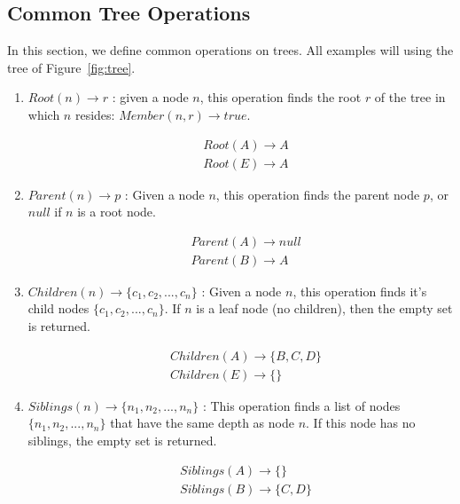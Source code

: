 \subsection{Common Tree Operations}

In this section, we define common operations on trees. All examples will using the tree of Figure~\ref{fig:tree}.



\begin{enumerate}

\item $Root(n) \rightarrow r$ : given a node $n$, this operation finds the root $r$ of the tree in which $n$ resides: $Member(n, r) \rightarrow true$.

    \begin{align*}
    & Root(A) \rightarrow A \\
    & Root(E) \rightarrow A
    \end{align*}

    
\item $Parent(n) \rightarrow p$ : Given a node $n$, this operation finds the parent node $p$, or $null$ if $n$ is a root node.

    \begin{align*}
    & Parent(A) \rightarrow  null \\
    & Parent(B) \rightarrow A
    \end{align*}

\item $Children(n) \rightarrow \{c_1, c_2, ..., c_n\}$ : Given a node $n$, this operation finds it's child nodes $\{c_1, c_2, ..., c_n\}$. If $n$ is a leaf node (no children), then the empty set is returned.

    \begin{align*}
    & Children(A) \rightarrow \{B, C, D\} \\
    & Children(E) \rightarrow \{\}
    \end{align*}
    
\item $Siblings(n) \rightarrow \{n_1, n_2, ..., n_n\}$ : This operation finds a list of nodes $\{n_1, n_2, ..., n_n\}$ that have the same depth as node $n$. If this node has no siblings, the empty set is returned.

    \begin{align*}
    & Siblings(A) \rightarrow \{\} \\
    & Siblings(B) \rightarrow \{C, D\}
    \end{align*}


\end{enumerate}
